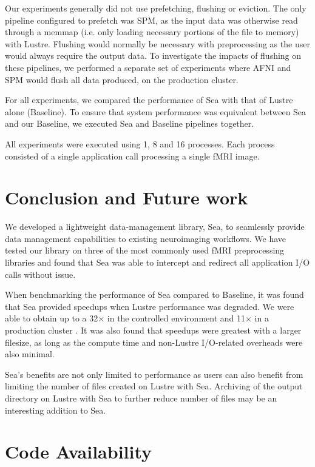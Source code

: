\documentclass[fleqn,10pt]{wlscirep}
\newcommand{\TG}[1]{\todo[color=green!60!black]{\textbf{\textsc{From Tristan:}} #1\xspace}}
\begin{document}
    Our experiments generally did not use prefetching, flushing or eviction. The
    only pipeline configured to prefetch was SPM, as the input data was otherwise
    read through a memmap (i.e. only loading necessary portions of the file to memory) 
    with Lustre. Flushing would normally be necessary with
    preprocessing as the user would always require the output data. To
    investigate the impacts of flushing on these pipelines, we performed a
    separate set of experiments where AFNI and SPM would flush all data
    produced, on the production cluster.

    For all experiments, we compared the performance of Sea with that of Lustre
    alone (Baseline). To ensure that system performance was equivalent between
    Sea and our Baseline, we executed Sea and Baseline pipelines together.
    
    All experiments were executed using 1, 8 and 16 processes.
    Each process consisted of a single application call processing a single fMRI image.
    
    \section{Conclusion and Future work}

    We developed a lightweight data-management library, Sea, to seamlessly
    provide data management capabilities to existing neuroimaging workflows. We
    have tested our library on three of the most commonly used fMRI
    preprocessing libraries and found that Sea was able to intercept and
    redirect all application I/O calls without issue. 

    When benchmarking the performance of Sea compared to Baseline, it was found that Sea provided speedups
    when Lustre performance was degraded. We were able to obtain up to a
    32$\times$ in the controlled environment and 11$\times$ in a production
    cluster \TG{Double check this number}. It was also found that speedups were greatest with a larger
    filesize, as long as the compute time and non-Lustre I/O-related overheads
    were also minimal.

     Sea's benefits are not only limited to performance as
    users can also benefit from limiting the number of files created on Lustre
    with Sea. Archiving of the output directory on Lustre with Sea to further
    reduce number of files may be an interesting addition to Sea.

    \section{Code Availability}
\end{document}
